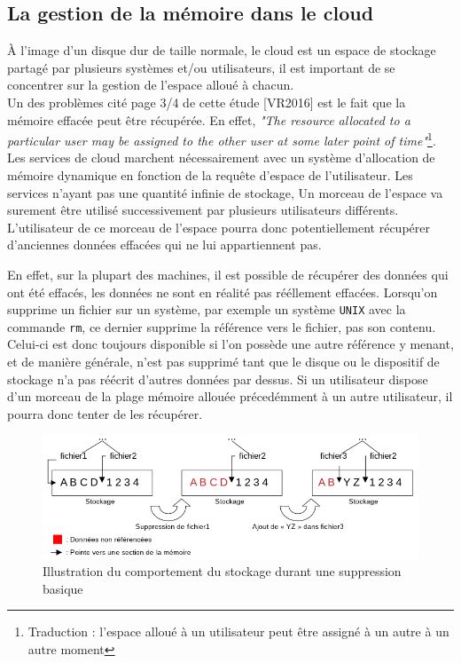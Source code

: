 \documentclass[a4paper, 12pt]{article}
\begin{document}
    \subsection{La gestion de la mémoire dans le cloud}
      À l'image d'un disque dur de taille normale, le cloud est un espace de
      stockage partagé par plusieurs systèmes et/ou utilisateurs, il est
      important de se concentrer sur la gestion de l'espace alloué à chacun. \\

      Un des problèmes cité page 3/4 de cette étude [VR2016] est le fait que la
      mémoire effacée peut être récupérée. En effet, \textit{"The resource
      allocated to a particular user may be assigned to the other user at some
      later point of time"}\footnote{Traduction : l'espace alloué à un
      utilisateur peut être assigné à un autre à un autre moment}. Les services
      de cloud marchent nécessairement avec un système d'allocation de mémoire
      dynamique en fonction de la requête d'espace de l'utilisateur. Les
      services n'ayant pas une quantité infinie de stockage, Un morceau de
      l'espace va surement être utilisé successivement par plusieurs
      utilisateurs différents. L'utilisateur de ce morceau de l'espace pourra
      donc potentiellement récupérer d'anciennes données effacées qui ne lui
      appartiennent pas.

      En effet, sur la plupart des machines, il est possible de récupérer des
      données qui ont été effacés, les données ne sont en réalité pas rééllement
      effacées. Lorsqu'on supprime un fichier sur un système, par exemple un
      système \verb+UNIX+ avec la commande \verb+rm+, ce dernier supprime la
      référence vers le fichier, pas son contenu. Celui-ci est donc toujours
      disponible si l'on possède une autre référence y menant, et de manière
      générale, n'est pas supprimé tant que le disque ou le dispositif de
      stockage n'a pas réécrit d'autres données par dessus. Si un utilisateur
      dispose d'un morceau de la plage mémoire allouée précedémment à un autre
      utilisateur, il pourra donc tenter de les récupérer.

      \begin{figure}[h]
        \centering
        \includegraphics[scale=.54]{img/schema_memoire.png}
        \caption{Illustration du comportement du stockage durant une suppression
        basique}
      \end{figure}
\end{document}
